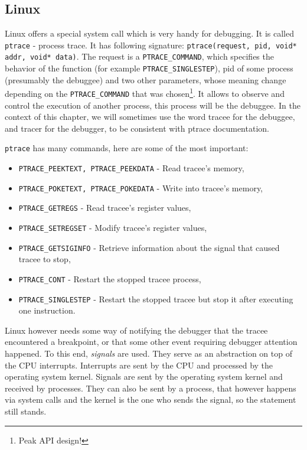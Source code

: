 \subsection{Linux}\label{section:linux-dbg}
Linux offers a special system call which is very handy for debugging. It is
called \texttt{ptrace} \cite{ptrace} - process trace. It has following
signature: \texttt{ptrace(request, pid, void* addr, void* data)}. The request
is a \texttt{PTRACE\_COMMAND}, which specifies the behavior of the function
(for example \texttt{PTRACE\_SINGLESTEP}), pid of some process (presumably the
debuggee) and two other parameters, whose meaning change depending on the
\texttt{PTRACE\_COMMAND} that was chosen\footnote{Peak API design!}. It allows
to observe and control the execution of another process, this process will be
the debuggee. In the context of this chapter, we will sometimes use the word
tracee for the debuggee, and tracer for the debugger, to be consistent with
ptrace documentation.

\texttt{ptrace} has many commands, here are some of the most important:
\begin{itemize}
    \item \texttt{PTRACE\_PEEKTEXT, PTRACE\_PEEKDATA} - Read tracee's memory,
    \item \texttt{PTRACE\_POKETEXT, PTRACE\_POKEDATA} - Write into tracee's
          memory,
    \item \texttt{PTRACE\_GETREGS} - Read tracee's register values,
    \item \texttt{PTRACE\_SETREGSET} - Modify tracee's register values,
    \item \texttt{PTRACE\_GETSIGINFO} - Retrieve information about the signal
                                        that caused tracee to stop,
    \item \texttt{PTRACE\_CONT} - Restart the stopped tracee process,
    \item \texttt{PTRACE\_SINGLESTEP} - Restart the stopped tracee but
          stop it after executing one instruction.
\end{itemize}

Linux however needs some way of notifying the debugger that the tracee
encountered a breakpoint, or that some other event requiring debugger attention
happened. To this end, \textit{signals} are used. They serve as an abstraction
on top of the CPU interrupts. Interrupts are sent by the CPU and processed by
the operating system kernel. Signals are sent by the operating system kernel
and received by processes. They can also be sent by a process, that however
happens via system calls and the kernel is the one who sends the signal, so the
statement still stands.

